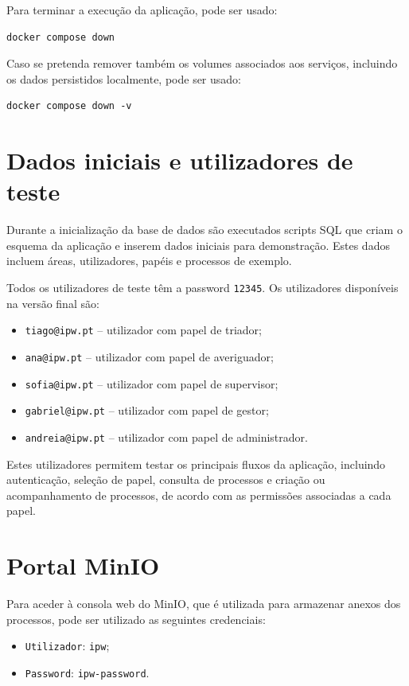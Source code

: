 \documentclass[11pt,a4paper]{article}
\begin{document}
Para terminar a execução da aplicação, pode ser usado:

\begin{lstlisting}[style=command]
docker compose down
    \end{lstlisting}

Caso se pretenda remover também os volumes associados aos serviços, incluindo os dados persistidos localmente, pode ser usado:

\begin{lstlisting}[style=command]
docker compose down -v
    \end{lstlisting}

\section{Dados iniciais e utilizadores de teste}

Durante a inicialização da base de dados são executados scripts SQL que criam o esquema da aplicação e inserem dados iniciais para demonstração. Estes dados incluem áreas, utilizadores, papéis e processos de exemplo.

Todos os utilizadores de teste têm a password \texttt{12345}. Os utilizadores disponíveis na versão final são:

\begin{itemize}
  \item \texttt{tiago@ipw.pt} -- utilizador com papel de triador;
  \item \texttt{ana@ipw.pt} -- utilizador com papel de averiguador;
  \item \texttt{sofia@ipw.pt} -- utilizador com papel de supervisor;
  \item \texttt{gabriel@ipw.pt} -- utilizador com papel de gestor;
  \item \texttt{andreia@ipw.pt} -- utilizador com papel de administrador.
\end{itemize}

Estes utilizadores permitem testar os principais fluxos da aplicação, incluindo autenticação, seleção de papel, consulta de processos e criação ou acompanhamento de processos, de acordo com as permissões associadas a cada papel.

\section{Portal MinIO}

Para aceder à consola web do MinIO, que é utilizada para armazenar anexos dos processos, pode ser utilizado as seguintes credenciais:
\begin{itemize}
  \item \texttt{Utilizador}: \texttt{ipw};
  \item \texttt{Password}: \texttt{ipw-password}.
\end{itemize}
\end{document}
